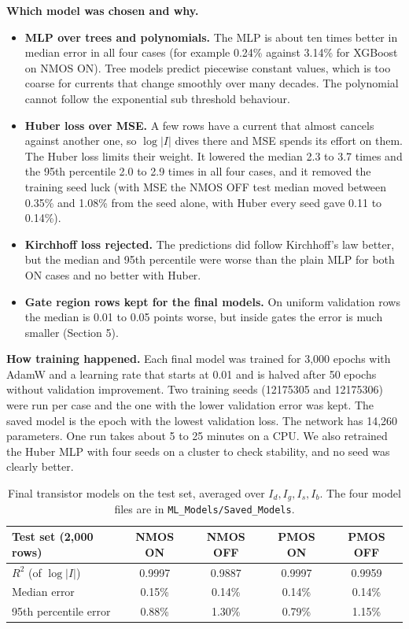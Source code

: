 \documentclass[10pt,a4paper]{article}
\begin{document}
\textbf{Which model was chosen and why.}
\begin{itemize}
\item \textbf{MLP over trees and polynomials.} The MLP is about ten times better in median error in all four cases (for example 0.24\% against 3.14\% for XGBoost on NMOS ON). Tree models predict piecewise constant values, which is too coarse for currents that change smoothly over many decades. The polynomial cannot follow the exponential sub threshold behaviour.
\item \textbf{Huber loss over MSE.} A few rows have a current that almost cancels against another one, so $\log|I|$ dives there and MSE spends its effort on them. The Huber loss limits their weight. It lowered the median 2.3 to 3.7 times and the 95th percentile 2.0 to 2.9 times in all four cases, and it removed the training seed luck (with MSE the NMOS OFF test median moved between 0.35\% and 1.08\% from the seed alone, with Huber every seed gave 0.11 to 0.14\%).
\item \textbf{Kirchhoff loss rejected.} The predictions did follow Kirchhoff's law better, but the median and 95th percentile were worse than the plain MLP for both ON cases and no better with Huber.
\item \textbf{Gate region rows kept for the final models.} On uniform validation rows the median is 0.01 to 0.05 points worse, but inside gates the error is much smaller (Section 5).
\end{itemize}

\textbf{How training happened.} Each final model was trained for 3,000 epochs with AdamW and a learning rate that starts at 0.01 and is halved after 50 epochs without validation improvement. Two training seeds (12175305 and 12175306) were run per case and the one with the lower validation error was kept. The saved model is the epoch with the lowest validation loss. The network has 14,260 parameters. One run takes about 5 to 25 minutes on a CPU. We also retrained the Huber MLP with four seeds on a cluster to check stability, and no seed was clearly better.

\begin{table}[H]
\centering\small
\begin{tabular}{@{}lcccc@{}}
\toprule
Test set (2,000 rows) & NMOS ON & NMOS OFF & PMOS ON & PMOS OFF\\
\midrule
$R^2$ (of $\log|I|$) & 0.9997 & 0.9887 & 0.9997 & 0.9959\\
Median error & 0.15\% & 0.14\% & 0.14\% & 0.14\%\\
95th percentile error & 0.88\% & 1.30\% & 0.79\% & 1.15\%\\
\bottomrule
\end{tabular}
\caption{Final transistor models on the test set, averaged over $I_d, I_g, I_s, I_b$. The four model files are in \texttt{ML\_Models/Saved\_Models}.}\label{tab:final}
\end{table}
\end{document}
